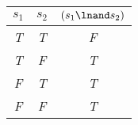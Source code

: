 
\begin{center}
\begin{tabular}{c c||c}
 $s_1$  & $s_2$ & $(s_1 \lnand s_2)$\\
\hline
\emph{T} & \emph{T} & \emph{F} \\
\emph{T} & \emph{F} & \emph{T}  \\
\emph{F} & \emph{T} & \emph{T} \\
\emph{F} & \emph{F} & \emph{T} \\
\end{tabular}
\end{center}

